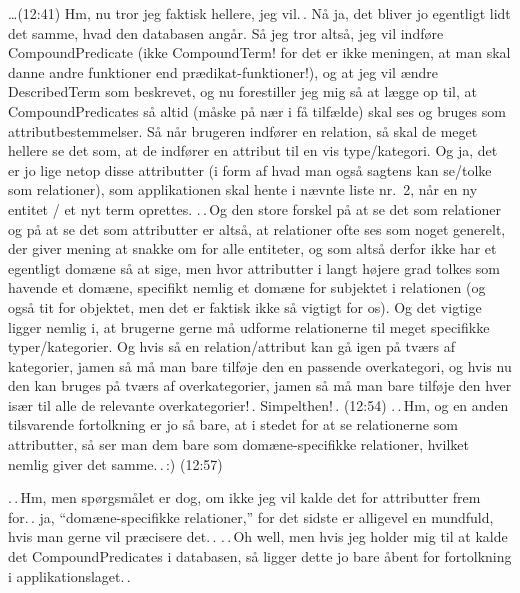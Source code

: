 \documentclass{report}
\begin{document}
\ldots (12:41) Hm, nu tror jeg faktisk hellere, jeg vil.\,. Nå ja, det bliver jo egentligt lidt det samme, hvad den databasen angår. Så jeg tror altså, jeg vil indføre CompoundPredicate (ikke CompoundTerm! for det er ikke meningen, at man skal danne andre funktioner end prædikat-funktioner!), og at jeg vil ændre DescribedTerm som beskrevet, og nu forestiller jeg mig så at lægge op til, at CompoundPredicates så altid (måske på nær i få tilfælde) skal ses og bruges som attributbestemmelser. Så når brugeren indfører en relation, så skal de meget hellere se det som, at de indfører en attribut til en vis type/kategori. Og ja, det er jo lige netop disse attributter (i form af hvad man også sagtens kan se/tolke som relationer), som applikationen skal hente i nævnte liste nr.\ 2, når en ny entitet / et nyt term oprettes. .\,.\,Og den store forskel på at se det som relationer og på at se det som attributter er altså, at relationer ofte ses som noget generelt, der giver mening at snakke om for alle entiteter, og som altså derfor ikke har et egentligt domæne så at sige, men hvor attributter i langt højere grad tolkes som havende et domæne, specifikt nemlig et domæne for subjektet i relationen (og også tit for objektet, men det er faktisk ikke så vigtigt for os). Og det vigtige ligger nemlig i, at brugerne gerne må udforme relationerne til meget specifikke typer/kategorier. Og hvis så en relation/attribut kan gå igen på tværs af kategorier, jamen så må man bare tilføje den en passende overkategori, og hvis nu den kan bruges på tværs af overkategorier, jamen så må man bare tilføje den hver især til alle de relevante overkategorier!\,. Simpelthen!\,. (12:54) .\,.\,Hm, og en anden tilsvarende fortolkning er jo så bare, at i stedet for at se relationerne som attributter, så ser man dem bare som domæne-specifikke relationer, hvilket nemlig giver det samme.\,.\,:) (12:57)

.\,.\,Hm, men spørgsmålet er dog, om ikke jeg vil kalde det for attributter frem for.\,. ja, ``domæne-specifikke relationer,'' for det sidste er alligevel en mundfuld, hvis man gerne vil præcisere det.\,. .\,.\,Oh well, men hvis jeg holder mig til at kalde det CompoundPredicates i databasen, så ligger dette jo bare åbent for fortolkning i applikationslaget.\,. 
\end{document}
